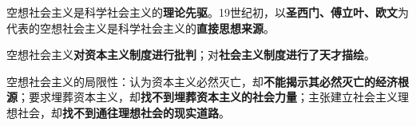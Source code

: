 {空想社会主义是科学社会主义的}\textbf{{{理论先驱}}}{。19世纪初，以{{\textbf{圣西门、傅立叶、欧文}}}为代表的空想社会主义是科学社会主义的}\textbf{{{直接思想来源}}}{。}

空想社会主义\textbf{{对资本主义制度进行批判}}；对{\textbf{社会主义制度进行了天才描绘}}。

{空想社会主义的局限性：认为资本主义必然灭亡，却}\textbf{{不能揭示其必然灭亡的经济根源}}{；要求埋葬资本主义，却}\textbf{{找不到埋葬资本主义的社会力量}}{；主张建立社会主义理想社会，却}\textbf{{找不到通往理想社会的现实道路}}{。}
